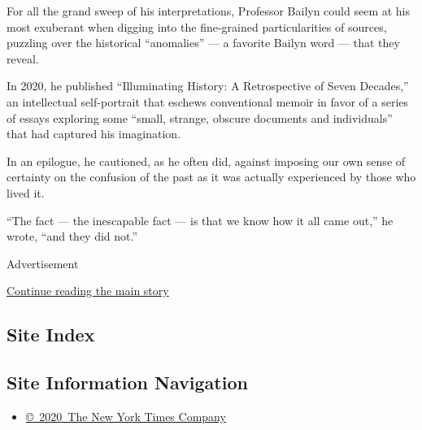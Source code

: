 For all the grand sweep of his interpretations, Professor Bailyn could
seem at his most exuberant when digging into the fine-grained
particularities of sources, puzzling over the historical ``anomalies''
--- a favorite Bailyn word --- that they reveal.

In 2020, he published ``Illuminating History: A Retrospective of Seven
Decades,'' an intellectual self-portrait that eschews conventional
memoir in favor of a series of essays exploring some ``small, strange,
obscure documents and individuals'' that had captured his imagination.

In an epilogue, he cautioned, as he often did, against imposing our own
sense of certainty on the confusion of the past as it was actually
experienced by those who lived it.

``The fact --- the inescapable fact --- is that we know how it all came
out,'' he wrote, ``and they did not.''

Advertisement

\protect\hyperlink{after-bottom}{Continue reading the main story}

\hypertarget{site-index}{%
\subsection{Site Index}\label{site-index}}

\hypertarget{site-information-navigation}{%
\subsection{Site Information
Navigation}\label{site-information-navigation}}

\begin{itemize}
\tightlist
\item
  \href{https://help.nytimes.com/hc/en-us/articles/115014792127-Copyright-notice}{©~2020~The
  New York Times Company}
\end{itemize}


